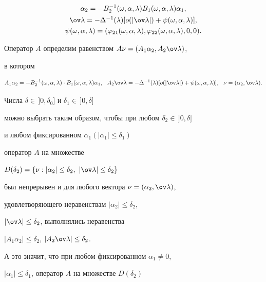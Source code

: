 \begin{pf}
\begin{gather*}
\alpha_2 = - B_2^{- 1} (\omega,\alpha,\lambda)


B_1 (\omega,\alpha,\lambda)\alpha_1, \\


\ov \lambda = - \Delta ^{- 1} (\lambda)


[o(|\ov \lambda |)+\psi (\omega,\alpha,\lambda)], \\


\psi (\omega,\alpha,\lambda)=(\varphi_{21}


(\omega,\alpha,\lambda),\varphi_{22} (\omega,\alpha,\lambda),0,0). 


\end{gather*}





Оператор $A$ определим равенством $A\nu =(A_1 \alpha_2,A_2 \ov \lambda)$,


в котором


$$


A_1 \alpha_2 = - B_2^{- 1} (\omega,\alpha,\lambda)\cdot


B_1 (\omega,\alpha,\lambda)\alpha_1,


\ \ A_2 \ov \lambda = - \Delta ^{- 1} (\lambda)


[o(|\ov \lambda |)+\psi (\omega,\alpha,\lambda)],


\ \ \nu =(\alpha_2,\ov \lambda).


$$





Числа $\delta \in\,]0,\delta_0]$ и $\delta_1 \in\,]0,\delta]$


можно выбрать таким образом, чтобы при любом $\delta_2 \in\,]0,\delta]$


и любом фиксированном $\alpha_1 (|\alpha_1 | \le \delta_1)$


оператор $A$ на множестве


$D(\delta_2)=\{\nu:|\alpha_2|\le \delta_2,\ |\ov \lambda|\le \delta_2\}$


был непрерывен и для любого вектора $\nu =(\alpha_2,\ov \lambda)$,


удовлетворяющего неравенствам $|\alpha_2 | \le \delta_2$,


$|\ov \lambda | \le \delta_2$, выполнялись неравенства


$|A_1 \alpha_2 | \le \delta_2$, $|A_2 \ov \lambda | \le \delta_2$.


А это значит, что при любом фиксированном $\alpha_1 \ne 0$,


$|\alpha_1 | \le \delta_1$, оператор $A$ на множестве $D(\delta_2)$



\end{pf}
